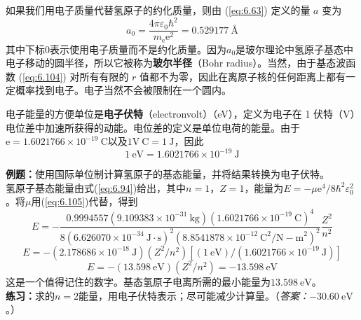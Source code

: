     如果我们用电子质量代替氢原子的约化质量，则由 (\ref{eq:6.63}) 定义的量 $a$ 变为
    \begin{equation}
        a_0 = \frac{4\pi\varepsilon_0\hbar^2}{m_{\mathrm{e}}\mathrm{e}^2} = 0.529177 \: \mathrm{Å}
        \label{eq:6.106}
    \end{equation}
    其中下标$0$表示使用电子质量而不是约化质量。因为$a_0$是玻尔理论中氢原子基态中电子移动的圆半径，所以它被称为\textbf{玻尔半径}（Bohr radius）。当然，由于基态波函数 (\ref{eq:6.104}) 对所有有限的 $r$ 值都不为零，因此在离原子核的任何距离上都有一定概率找到电子。电子当然不会被限制在一个圆内。

    电子能量的方便单位是\textbf{电子伏特}（electronvolt）（eV），定义为电子在 1 伏特（V）电位差中加速所获得的动能。电位差的定义是单位电荷的能量。由于$\mathrm{e} = 1.6021766 \times 10^{-19} \: \mathrm{C}$以及$1 \mathrm{V} \: \mathrm{C} = 1 \: \mathrm{J}$，因此
    \begin{equation}
        1 \: \mathrm{eV} = 1.6021766 \times 10^{-19} \: \mathrm{J}
        \label{eq:6.107}
    \end{equation}

    \begin{examplebox}
        \textbf{例题：}使用国际单位制计算氢原子的基态能量，并将结果转换为电子伏特。
        \\

        氢原子基态能量由式(\ref{eq:6.94})给出，其中$n=1$，$Z=1$，能量为$E = -\mu\mathrm{e}^4/8\hbar^2\varepsilon_0^2$。将$\mu$用(\ref{eq:6.105})代替，得到
        \begin{equation*}
            E = -\frac{0.9994557\left(9.109383 \times 10^{-31} \: \mathrm{kg}\right)\left(1.6021766 \times 10^{-19} \: \mathrm{C}\right)^4}{8\left(6.626070 \times 10^{-34} \: \mathrm{J} \cdot \mathrm{s}\right)^2\left(8.8541878 \times 10^{-12} \: \mathrm{C}^2/\mathrm{N-m}^2\right)^2}\frac{Z^2}{n^2}
        \end{equation*}
        \begin{equation*}
            E = -\left(2.178686 \times 10^{-18} \: \mathrm{J}\right)\left(Z^2/n^2\right)\left[\left(1\:\mathrm{eV}\right)/\left(1.6021766 \times 10^{-19} \: \mathrm{J}\right)\right]
        \end{equation*}
        \begin{equation}
            E = -\left(13.598 \: \mathrm{eV}\right)\left(Z^2/n^2\right) = -13.598 \: \mathrm{eV}
            \label{eq:6.108}
        \end{equation}
        这是一个值得记住的数字。基态氢原子电离所需的最小能量为$13.598 \: \mathrm{eV}$。
        \\

        \textbf{练习：}求的$n=2$能量，用电子伏特表示；尽可能减少计算量。（\textit{答案：}$-30.60 \: \mathrm{eV}$。）
    \end{examplebox}

